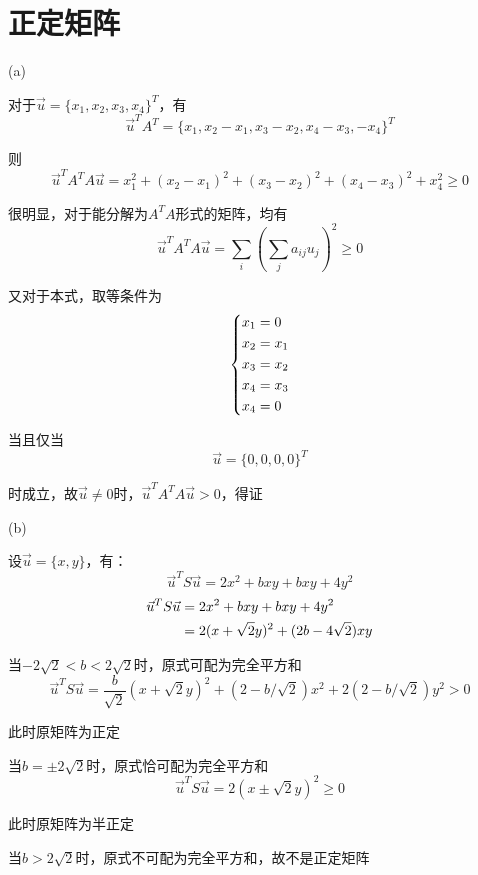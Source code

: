 \documentclass{article}
\begin{document}
\section{正定矩阵}
\par
(a)\par
对于$\vec u=\{x_1,x_2,x_3,x_4\}^T$，有
$$\vec u^TA^T=\{x_1,x_2-x_1,x_3-x_2, x_4-x_3,-x_4\}^T$$
\par
则
$$\vec u^TA^TA\vec u=x_1^2+(x_2-x_1)^2+(x_3-x_2)^2+(x_4-x_3)^2+x_4^2\geq 0$$
\par
很明显，对于能分解为$A^TA$形式的矩阵，均有
$$\vec u^TA^TA\vec u=\sum_i \left(\sum_j a_{ij}u_j\right)^2\geq 0$$
\par
又对于本式，取等条件为
\begin{equation}
    \begin{gathered}
     \left\{
     \begin{split}
        &x_1=0\\
        &x_2=x_1\\
        &x_3=x_2\\
        &x_4=x_3\\
        &x_4=0
        \notag
     \end{split}
    \right.
    \end{gathered}
\end{equation}
\par
当且仅当
$$\vec u=\{0,0,0,0\}^T$$
\par
时成立，故$\vec u\neq 0$时，$\vec u^TA^TA\vec u>0$，得证\par
(b)\par
设$\vec u=\{x,y\}$，有：
$$\vec u^TS\vec u=2x^2+bxy+bxy+4y^2$$
\begin{equation}
    \begin{gathered}
     \begin{split}
        \vec u^TS\vec u&=2x^2+bxy+bxy+4y^2\\
        &=2(x+\sqrt 2y)^2+(2b-4\sqrt 2)xy
        \notag
     \end{split}
    \end{gathered}
\end{equation}
\par
当$-2\sqrt 2<b<2\sqrt 2$时，原式可配为完全平方和
$$\vec u^TS\vec u=\frac{b}{\sqrt 2}(x+\sqrt 2y)^2+(2-b/\sqrt 2)x^2+2(2-b/\sqrt 2)y^2> 0$$
\par
此时原矩阵为正定
\par
当$b=\pm 2\sqrt 2$时，原式恰可配为完全平方和
$$\vec u^TS\vec u=2(x\pm \sqrt 2y)^2\geq 0$$
\par
此时原矩阵为半正定
\par
当$b>2\sqrt 2$时，原式不可配为完全平方和，故不是正定矩阵
\end{document}
